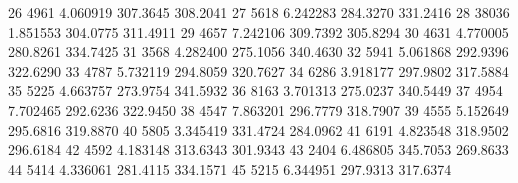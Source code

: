\documentclass[nojss]{jss}
\begin{document}
\begin{Schunk}
\begin{Soutput}
26  4961 4.060919 307.3645 308.2041
27  5618 6.242283 284.3270 331.2416
28 38036 1.851553 304.0775 311.4911
29  4657 7.242106 309.7392 305.8294
30  4631 4.770005 280.8261 334.7425
31  3568 4.282400 275.1056 340.4630
32  5941 5.061868 292.9396 322.6290
33  4787 5.732119 294.8059 320.7627
34  6286 3.918177 297.9802 317.5884
35  5225 4.663757 273.9754 341.5932
36  8163 3.701313 275.0237 340.5449
37  4954 7.702465 292.6236 322.9450
38  4547 7.863201 296.7779 318.7907
39  4555 5.152649 295.6816 319.8870
40  5805 3.345419 331.4724 284.0962
41  6191 4.823548 318.9502 296.6184
42  4592 4.183148 313.6343 301.9343
43  2404 6.486805 345.7053 269.8633
44  5414 4.336061 281.4115 334.1571
45  5215 6.344951 297.9313 317.6374
\end{Soutput}
\end{Schunk}
\end{document}
